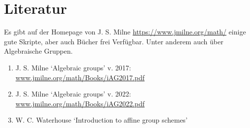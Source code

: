 \documentclass[a4paper, 11pt]{scrartcl}
\theoremstyle{basicstyle}
\begin{document}
    \section{Literatur}

    Es gibt auf der Homepage von J. S. Milne \url{https://www.jmilne.org/math/} einige gute Skripte, aber auch Bücher frei Verfügbar.
    Unter anderem auch über Algebraische Gruppen.
    
    \begin{enumerate}
        \item J. S. Milne `Algebraic groups' v. 2017: \url{www.jmilne.org/math/Books/iAG2017.pdf}
        \item J. S. Milne `Algebraic groups' v. 2022: \url{www.jmilne.org/math/Books/iAG2022.pdf}
        \item W. C. Waterhouse `Introduction to affine group schemes'
    \end{enumerate}
\end{document}
